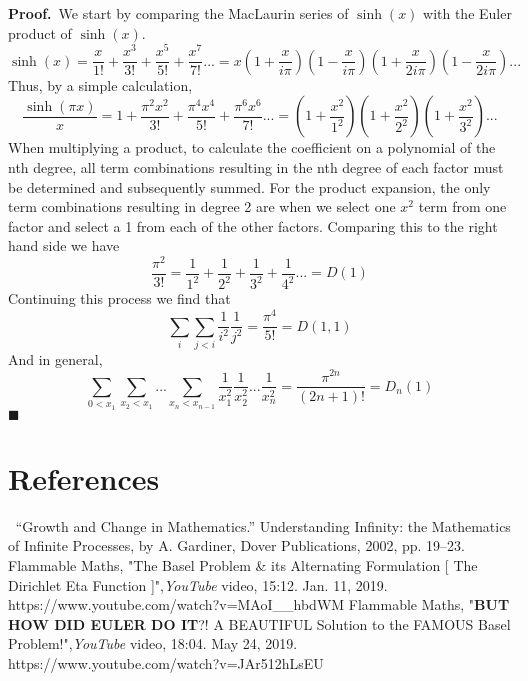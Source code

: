 \documentclass[12pt]{article}
\begin{document}
\newline
\textbf{Proof.}\
We start by comparing the MacLaurin series of \(\sinh(x)\) with the Euler product of \(\sinh(x)\).
\[\sinh(x)=\frac{x}{1!} + \frac{x^3}{3!} + \frac{x^5}{5!} + \frac{x^7}{7!}... =x\left(1+\frac{x}{i\pi}\right)\left(1-\frac{x}{i\pi}\right)\left(1+\frac{x}{2i\pi}\right)\left(1-\frac{x}{2i\pi}\right)...\]
Thus, by a simple calculation,
\[\frac{\sinh(\pi x)}{x}=1+\frac{\pi^2x^2}{3!}+\frac{\pi^4x^4}{5!}+\frac{\pi^6x^6}{7!}...=\left(1+\frac{x^2}{1^2}\right)\left(1+\frac{x^2}{2^2}\right)\left(1+\frac{x^2}{3^2}\right)...\]
\newline
When multiplying a product, to calculate the coefficient on a polynomial of the nth degree, all term combinations resulting in the nth degree of each factor must be determined and subsequently summed. \newline
\newline
For the product expansion, the only term combinations resulting in degree 2 are when we select one \(x^2\) term from one factor and select a 1 from each of the other factors. Comparing this to the right hand side we have
\[\frac{\pi^2}{3!}=\frac{1}{1^2}+\frac{1}{2^2}+\frac{1}{3^2}+\frac{1}{4^2}...=D(1)\]
\newline
\newline
Continuing this process we find that
\[\sum_i\sum_{j<i}\frac{1}{i^2}\frac{1}{j^2}=\frac{\pi^4}{5!}=D(1,1)\]
And in general,
\[\sum_{0<x_1}\sum_{x_2<x_1}...\sum_{x_n<x_{n-1}}\frac{1}{x_1^2}\frac{1}{x_2^2}...\frac{1}{x_n^2}=\frac{\pi^{2n}}{(2n+1)!}=D_n(1)\]
\(\blacksquare\)
\section{References}
\(\ \)
\newline
“Growth and Change in Mathematics.” Understanding Infinity: the Mathematics of Infinite Processes, by A. Gardiner, Dover Publications, 2002, pp. 19–23.
\newline
\newline
Flammable Maths, "The Basel Problem \& its Alternating Formulation [ The Dirichlet Eta Function ]",\textit{YouTube} video, 15:12. Jan. 11, 2019. \newline
https://www.youtube.com/watch?v=MAoI\_\_hbdWM
\newline
\newline
Flammable Maths, "\textbf{BUT HOW DID EULER DO IT}?! A BEAUTIFUL Solution to the FAMOUS Basel Problem!",\textit{YouTube} video, 18:04. May 24, 2019. https://www.youtube.com/watch?v=JAr512hLsEU
\end{document}
